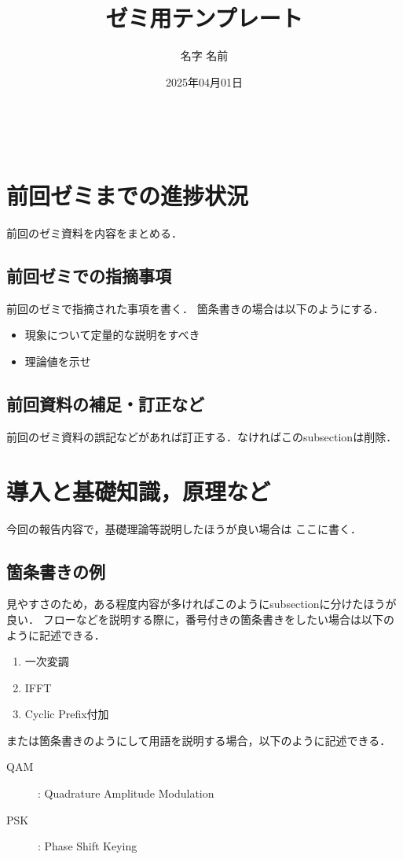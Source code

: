 \documentclass[fleqn, a4paper, twocolumn]{jsarticle}
\title{ゼミ用テンプレート}
\date{2025年04月01日}
\author{名字 名前}
\numberwithin{figure}{section}
\numberwithin{table}{section}
\numberwithin{equation}{section}
\begin{document}
\noindent{\textgt{\Large \thetitle}}\\  %
\noindent \theauthor \hfill             %
\thedate                                %

\section{前回ゼミまでの進捗状況}
前回のゼミ資料を内容をまとめる．

\subsection{前回ゼミでの指摘事項}
前回のゼミで指摘された事項を書く．
箇条書きの場合は以下のようにする．
\begin{itemize}
	\item 現象について定量的な説明をすべき
	\item 理論値を示せ
\end{itemize}

\subsection{前回資料の補足・訂正など}
前回のゼミ資料の誤記などがあれば訂正する．なければこのsubsectionは削除．

\section{導入と基礎知識，原理など}
今回の報告内容で，基礎理論等説明したほうが良い場合は
ここに書く．

\subsection{箇条書きの例}
見やすさのため，ある程度内容が多ければこのようにsubsectionに分けたほうが良い．
フローなどを説明する際に，番号付きの箇条書きをしたい場合は以下のように記述できる．
\begin{enumerate}
	\item 一次変調
	\item IFFT
	\item Cyclic Prefix付加
\end{enumerate}
または箇条書きのようにして用語を説明する場合，以下のように記述できる．
\begin{description}
	\item [QAM]: Quadrature Amplitude Modulation
	\item [PSK]: Phase Shift Keying
\end{description}
\end{document}
